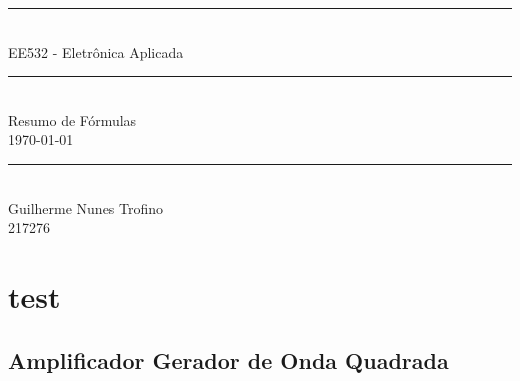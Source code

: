 \documentclass{article}
\begin{document}
    \begin{titlepage}
        \begin{center}
            \rule{450pt}{0.5pt}\\[4mm]
            {\Huge EE532 - Eletrônica Aplicada}\\
            \rule{450pt}{0.5pt}\\[2mm]
            {\Large Resumo de Fórmulas}\\[200mm]
            \today\\
            \rule{250pt}{0.5pt}\\
            {\large Guilherme Nunes Trofino}\\
            {\large 217276}\\
        \end{center}
    \end{titlepage}
\newpage

    \section{test}
    \subsection{Amplificador Gerador de Onda Quadrada}
\end{document}
